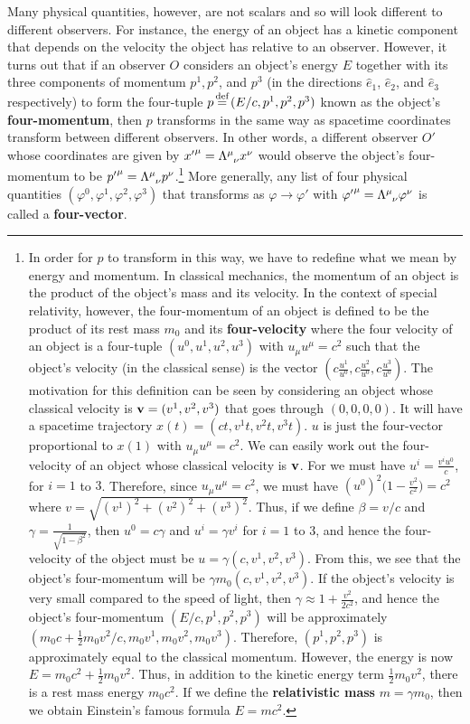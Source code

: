 Many physical quantities, however, are not scalars and so will look different to different observers. For instance, the energy of an object has a kinetic component that depends on the velocity the object has relative to an observer. However, it turns out that if an observer $O$ considers an object's energy $E$ together with its three components of momentum $p^1, p^2$, and $p^3$ (in the directions $\hat{e}_1$, $\hat{e}_2$, and $\hat{e}_3$ respectively) to form the four-tuple $p\myeq(E/c, p^1, p^2, p^3)$ known as the object's \textbf{four-momentum}, then $p$ transforms in the same way as spacetime coordinates transform between different observers. In other words, a different observer $O'$ whose coordinates are given by ${x'}^\mu=\Lambda\indices{^\mu_\nu}x^\nu$ would observe the object's four-momentum to be ${p'}^\mu=\Lambda\indices{^\mu_\nu}p^\nu$.\footnote{In order for $p$ to transform in this way, we have to redefine what we mean by energy and momentum. In classical mechanics, the momentum of an object is the product of the object's mass and its velocity. In the context of special relativity, however, the four-momentum of an object is defined to be the product of its rest mass $m_0$ and its \textbf{four-velocity} where the four velocity of an object is a four-tuple $(u^0, u^1, u^2, u^3)$ with $u_\mu u^\mu=c^2$ such that the object's velocity (in the classical sense) is the vector $(c \frac{u^1}{u^0}, c \frac{u^2}{u^0}, c\frac{u^3}{u^0})$. The motivation for this definition can be seen by considering an object whose classical velocity is $\vb{v}=(v^1,v^2,v^3)$ that goes through $(0,0,0,0)$. It will have a spacetime trajectory $x(t)=(ct, v^1 t, v^2 t, v^3 t)$. $u$ is just the four-vector proportional to $x(1)$ with $u_\mu u^\mu=c^2$.  We can easily work out the 
four-velocity of an object whose classical velocity is $\vb{v}$. For we must have $u^i=\frac{v^i u^0}{c}$, for $i=1$ to $3$. Therefore, since $u_\mu u^\mu=c^2$, we must have $(u^0)^2\big(1-\frac{v^2}{c^2}\big)=c^2$ where $v=\sqrt{({v}^1)^2+({v}^2)^2+({v}^3)^2}$. Thus, if we define $\beta={v}/{c}$ and $\gamma=\frac{1}{\sqrt{1-\beta^2}}$, then $u^0=c\gamma$ and $u^i=\gamma v^i$ for $i=1$ to $3$, and hence the four-velocity of the object must be $u=\gamma(c,v^1,v^2,v^3).$ From this, we see that the object's four-momentum will be $\gamma m_0(c,v^1,v^2,v^3).$ If the object's velocity is very small compared to the speed of light, then $\gamma\approx 1+\frac{v^2}{2c^2}$, and hence the object's four-momentum $(E/c, p^1, p^2, p^3)$ will be approximately $(m_0c+\frac{1}{2}m_0{v^2}/c, m_0v^1,m_0v^2,m_0v^3)$. Therefore, $(p^1, p^2, p^3)$ is approximately equal to the classical momentum. However, the energy is now $E=m_0c^2+\frac{1}{2}m_0{v^2}$. Thus, in addition to the kinetic energy term $\frac{1}{2}m_0{v^2}$, there is a rest mass energy $m_0c^2$. If we define the \textbf{relativistic mass} $m=\gamma m_0$, then we obtain Einstein's famous formula $E=mc^2$.  } More generally, any list of four physical quantities $(\varphi^0, \varphi^1, \varphi^2, \varphi^3)$ that transforms as $\varphi\rightarrow\varphi'$ with  ${\varphi'}^\mu=\Lambda\indices{^\mu_\nu}\varphi^\nu$ is called a \textbf{four-vector}.
